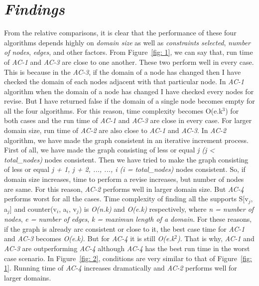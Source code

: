 \documentclass[12pt, english]{article}
\begin{document}
\section{\textit{Findings}}
\par
From the relative comparisons, it is clear that the performance of these four algorithms depends highly on \textit{domain size} as well as \textit{constraints selected}, \textit{number of nodes}, \textit{edges}, and other factors. From Figure~\ref{fig: 1}, we can say that, run time of \textit{AC-1} and \textit{AC-3} are close to one another. These two perform well in every case. This is because in the \textit{AC-3}, if the domain of a node has changed then I have checked the domain of each nodes adjacent with that particular node. In \textit{AC-1} algorithm when the domain of a node has changed I have checked every nodes for revise. But I have returned false if the domain of a single node becomes empty for all the four algorithms. For this reason, time complexity becomes O(e.k$^3$) for both cases and the run time of \textit{AC-1} and \textit{AC-3} are close in every case. For larger domain size, run time of \textit{AC-2} are also close to \textit{AC-1} and \textit{AC-3}. In \textit{AC-2} algorithm, we have made the graph consistent in an iterative increment process. First of all, we have made the graph consisting of less or equal \textit{j (j < total\_nodes)} nodes consistent. Then we have tried to make the graph consisting of less or equal \textit{j + 1, j + 2, ..., ..., i (i = total\_nodes)} nodes consistent. So, if domain size increases, time to perform a revise increases, but number of nodes are same. For this reason, \textit{AC-2} performs well in larger domain size. But \textit{AC-4} performs worst for all the cases. Time complexity of finding all the supports S[v$_j$, a$_j$] and counter(v$_i$, a$_i$, v$_j$) is \textit{O(n.k)} and \textit{O(e.k)} respectively, where \textit{n = number of nodes}, \textit{e = number of edges}, \textit{k = maximun length of a domain}. For these reasons, if the graph is already arc consistent or close to it, the best case time for \textit{AC-1} and \textit{AC-3} becomes \textit{O(e.k)}. But for \textit{AC-4} it is still \textit{O(e.k$^2$)}. That is why, \textit{AC-1} and \textit{AC-3} are outperforming \textit{AC-4} although \textit{AC-4} has the best run time in the worst case scenario. In Figure~\ref{fig: 2}, conditions are very similar to that of Figure~\ref{fig: 1}. Running time of \textit{AC-4} increases dramatically and \textit{AC-2} performs well for larger domains.
\end{document}
